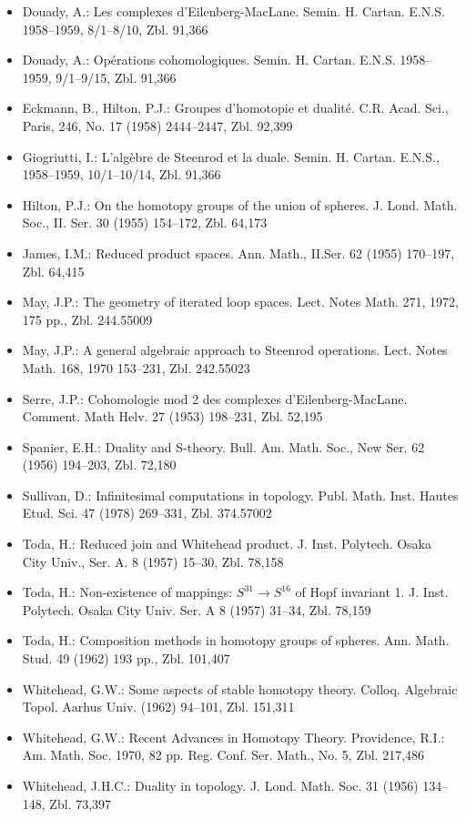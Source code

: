 \begin{itemize}
\item Douady, A.: Les complexes d'Eilenberg-MacLane. Semin. H. Cartan. E.N.S. 1958--1959, 8/1--8/10, Zbl. 91,366
\item Douady, A.: Opérations cohomologiques. Semin. H. Cartan. E.N.S. 1958--1959, 9/1--9/15, Zbl. 91,366
\item Eckmann, B., Hilton, P.J.: Groupes d'homotopie et dualité. C.R. Acad. Sci., Paris, 246, No. 17 (1958) 2444--2447, Zbl. 92,399
\item Giogriutti, I.: L'algèbre de Steenrod et la duale. Semin. H. Cartan. E.N.S., 1958--1959, 10/1--10/14, Zbl. 91,366
\item Hilton, P.J.: On the homotopy groups of the union of spheres. J. Lond. Math. Soc., II. Ser. 30 (1955) 154--172, Zbl. 64,173
\item James, I.M.: Reduced product spaces. Ann. Math., II.Ser. 62 (1955) 170--197, Zbl. 64,415
\item May, J.P.: The geometry of iterated loop spaces. Lect. Notes Math. 271, 1972, 175 pp., Zbl. 244.55009
\item May, J.P.: A general algebraic approach to Steenrod operations. Lect. Notes Math. 168, 1970 153--231, Zbl. 242.55023
\item Serre, J.P.: Cohomologie mod 2 des complexes d'Eilenberg-MacLane. Comment. Math Helv. 27 (1953) 198--231, Zbl. 52,195
\item Spanier, E.H.: Duality and S-theory. Bull. Am. Math. Soc., New Ser. 62 (1956) 194--203, Zbl. 72,180
\item Sullivan, D.: Infinitesimal computations in topology. Publ. Math. Inst. Hautes Etud. Sci. 47 (1978) 269--331, Zbl. 374.57002
\item Toda, H.: Reduced join and Whitehead product. J. Inst. Polytech. Osaka City Univ., Ser. A. 8 (1957) 15--30, Zbl. 78,158
\item Toda, H.: Non-existence of mappings: $S^{31}\to S^{16}$ of Hopf invariant 1. J. Inst. Polytech. Osaka City Univ. Ser. A 8 (1957) 31--34, Zbl. 78,159
\item Toda, H.: Composition methods in homotopy groups of spheres. Ann. Math. Stud. 49 (1962) 193 pp., Zbl. 101,407
\item Whitehead, G.W.: Some aspects of stable homotopy theory. Colloq. Algebraic Topol. Aarhus Univ. (1962) 94--101, Zbl. 151,311
\item Whitehead, G.W.: Recent Advances in Homotopy Theory. Providence, R.I.: Am. Math. Soc. 1970, 82 pp. Reg. Conf. Ser. Math., No. 5, Zbl. 217,486
\item Whitehead, J.H.C.: Duality in topology. J. Lond. Math. Soc. 31 (1956) 134--148, Zbl. 73,397
\end{itemize}

